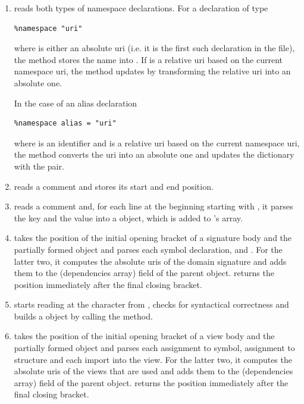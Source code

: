 \begin{enumerate}
\item {} reads both types of namespace declarations. For a declaration of type 
\begin{verbatim}
%namespace "uri"
\end{verbatim}
where  is either an absolute uri (i.e. it is the first such declaration in the file), the method stores the name into . If  is a relative uri based on the current namespace uri, the method updates  by transforming the relative uri into an absolute one.

In the case of an alias declaration
\begin{verbatim}
%namespace alias = "uri"
\end{verbatim}
where  is an identifier and  is a relative uri based on the current namespace uri, the method converts the uri into an absolute one and updates the  dictionary with the  pair.

\item {} reads a  comment and stores its start and end position.

\item {} reads a  comment and, for each line at the beginning starting with , it parses the key and the value into a  object, which is added to 's  array.

\item {} takes the position of the initial opening bracket of a signature body and the partially formed  object and parses each symbol declaration,  and . For the latter two, it computes the absolute uris of the domain signature and adds them to the  (dependencies array) field of the parent  object.   returns the position immediately after the final closing bracket.

\item {} starts reading at the \ttt{\%} character from , checks for syntactical correctness and builds a  object by calling the  method.

\item {} takes the position of the initial opening bracket of a view body and the partially formed  object and parses each assignment to symbol, assignment to structure and each import into the view. For the latter two, it computes the absolute uris of the views that are used and adds them to the  (dependencies array) field of the parent  object.   returns the position immediately after the final closing bracket.


\end{enumerate}
